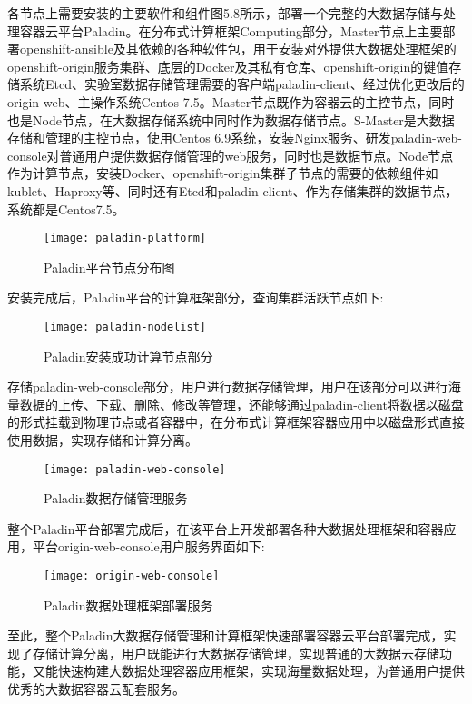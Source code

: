 各节点上需要安装的主要软件和组件图5.8所示，部署一个完整的大数据存储与处理容器云平台Paladin。在分布式计算框架Computing部分，Master节点上主要部署openshift-ansible及其依赖的各种软件包，用于安装对外提供大数据处理框架的openshift-origin服务集群、底层的Docker及其私有仓库、openshift-origin的键值存储系统Etcd、实验室数据存储管理需要的客户端paladin-client、经过优化更改后的origin-web、主操作系统Centos 7.5。Master节点既作为容器云的主控节点，同时也是Node节点，在大数据存储系统中同时作为数据存储节点。S-Master是大数据存储和管理的主控节点，使用Centos 6.9系统，安装Nginx服务、研发paladin-web-console对普通用户提供数据存储管理的web服务，同时也是数据节点。Node节点作为计算节点，安装Docker、openshift-origin集群子节点的需要的依赖组件如kublet、Haproxy等、同时还有Etcd和paladin-client、作为存储集群的数据节点，系统都是Centos7.5。
\begin{figure}[H] %
	\centering
	\texttt{[image: paladin-platform]}
	\caption{Paladin平台节点分布图}
\end{figure}

安装完成后，Paladin平台的计算框架部分，查询集群活跃节点如下:
\begin{figure}[H] %
	\centering
	\texttt{[image: paladin-nodelist]}
	\caption{Paladin安装成功计算节点部分}
\end{figure}

存储paladin-web-console部分，用户进行数据存储管理，用户在该部分可以进行海量数据的上传、下载、删除、修改等管理，还能够通过paladin-client将数据以磁盘的形式挂载到物理节点或者容器中，在分布式计算框架容器应用中以磁盘形式直接使用数据，实现存储和计算分离。
\begin{figure}[H] %
	\centering
	\texttt{[image: paladin-web-console]}
	\caption{Paladin数据存储管理服务}
\end{figure}

整个Paladin平台部署完成后，在该平台上开发部署各种大数据处理框架和容器应用，平台origin-web-console用户服务界面如下:
\begin{figure}[H] %
	\centering
	\texttt{[image: origin-web-console]}
	\caption{Paladin数据处理框架部署服务}
\end{figure}

至此，整个Paladin大数据存储管理和计算框架快速部署容器云平台部署完成，实现了存储计算分离，用户既能进行大数据存储管理，实现普通的大数据云存储功能，又能快速构建大数据处理容器应用框架，实现海量数据处理，为普通用户提供优秀的大数据容器云配套服务。

